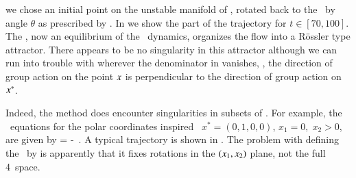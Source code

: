we chose an initial point on the unstable manifold
of , rotated back to the \slice\ by angle $\theta$ as
prescribed by . In  we
show the part of the trajectory for $t\in\left[70,100\right]$.
The \reqv, now an equilibrium of the
\reducedsp\ dynamics, organizes the flow into a R\"ossler type
attractor. There appears to be no singularity in this
attractor although we can run into trouble with
 wherever the denominator in
 vanishes, \ie, the direction of group
action on the point $x$ is perpendicular to the direction
of group action on $x^*$.


Indeed, the method does encounter singularities in
subsets of \statesp.
For example, the \reducedsp\ equations 
for the polar coordinates inspired \slice\
$x^{*}=(0,1,0,0)$, $x_1=0,\;x_2>0$,
are given by
\beq
\dot{\ssp} = \vel -  \Lg \cdot \ssp
\,.
A typical trajectory is shown in .
The problem with defining the \slice\ by
 is apparently that it fixes rotations
in the $(x_1,x_2)$ plane, not the full 4\dmn\ space.


\renewcommand{\Group}{\ensuremath{\Gamma}}    %
